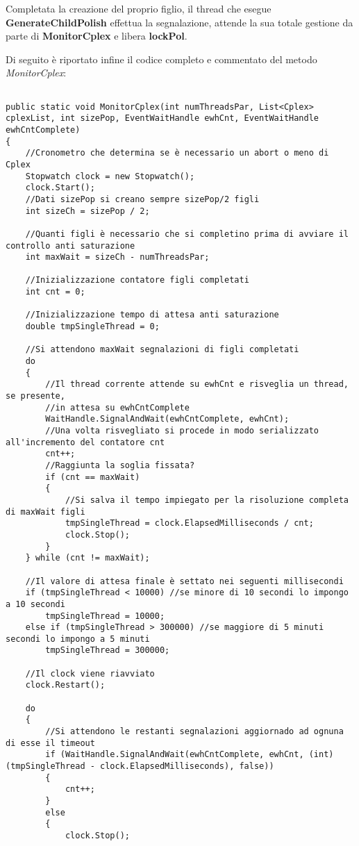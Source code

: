 \documentclass[11pt]{article}
\begin{document}
Completata la creazione del proprio figlio, il thread che esegue \textbf{GenerateChildPolish} effettua la segnalazione, attende la sua totale gestione da parte di \textbf{MonitorCplex} e libera \textbf{lockPol}.

Di seguito è riportato infine il codice completo e commentato del metodo \textit{MonitorCplex}:

\begin{lstlisting}

public static void MonitorCplex(int numThreadsPar, List<Cplex> cplexList, int sizePop, EventWaitHandle ewhCnt, EventWaitHandle ewhCntComplete)
{
    //Cronometro che determina se è necessario un abort o meno di Cplex
    Stopwatch clock = new Stopwatch();
    clock.Start();
    //Dati sizePop si creano sempre sizePop/2 figli
    int sizeCh = sizePop / 2;

    //Quanti figli è necessario che si completino prima di avviare il controllo anti saturazione
    int maxWait = sizeCh - numThreadsPar;

    //Inizializzazione contatore figli completati
    int cnt = 0;
    
    //Inizializzazione tempo di attesa anti saturazione
    double tmpSingleThread = 0;

    //Si attendono maxWait segnalazioni di figli completati
    do
    {
        //Il thread corrente attende su ewhCnt e risveglia un thread, se presente,
        //in attesa su ewhCntComplete
        WaitHandle.SignalAndWait(ewhCntComplete, ewhCnt);
        //Una volta risvegliato si procede in modo serializzato all'incremento del contatore cnt
        cnt++;
        //Raggiunta la soglia fissata?
        if (cnt == maxWait)
        {
            //Si salva il tempo impiegato per la risoluzione completa di maxWait figli
            tmpSingleThread = clock.ElapsedMilliseconds / cnt;
            clock.Stop();
        }
    } while (cnt != maxWait);

    //Il valore di attesa finale è settato nei seguenti millisecondi
    if (tmpSingleThread < 10000) //se minore di 10 secondi lo impongo a 10 secondi
        tmpSingleThread = 10000;
    else if (tmpSingleThread > 300000) //se maggiore di 5 minuti secondi lo impongo a 5 minuti
        tmpSingleThread = 300000;

    //Il clock viene riavviato
    clock.Restart();

    do
    {
        //Si attendono le restanti segnalazioni aggiornado ad ognuna di esse il timeout
        if (WaitHandle.SignalAndWait(ewhCntComplete, ewhCnt, (int)(tmpSingleThread - clock.ElapsedMilliseconds), false))
        {
            cnt++;
        }
        else
        {
            clock.Stop();


\end{lstlisting}
\end{document}
